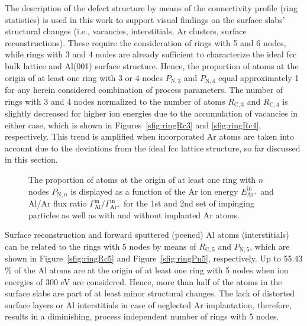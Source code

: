 \documentclass[12pt,a4paper,preprint,superscriptaddress]{revtex4-1}
\begin{document}
The description of the defect structure by means of the connectivity profile (ring statistics) is used in this work to support visual findings on the surface slabs' structural changes (i.e., vacancies, interstitials, Ar clusters, surface reconstructions). These require the consideration of rings with 5 and 6 nodes, while rings with 3 and 4 nodes are already sufficient to characterize the ideal fcc bulk lattice and Al(001) surface structure. Hence, the proportion of atoms at the origin of at least one ring with 3 or 4 nodes $P_{\mathrm{N},3}$ and $P_{\mathrm{N},4}$ equal approximately 1 for any herein considered combination of process parameters. The number of rings with 3 and 4 nodes normalized to the number of atoms $R_{\mathrm{C},3}$ and $R_{\mathrm{C},4}$ is slightly decreased for higher ion energies due to the accumulation of vacancies in either case, which is shown in Figures~\ref{sfig:ringRc3} and \ref{sfig:ringRc4}, respectively. This trend is amplified when incorporated Ar atoms are taken into account due to the deviations from the ideal fcc lattice structure, so far discussed in this section. 

\begin{figure}[t]
\hfill
{}
\caption{The proportion of atoms at the origin of at least one ring with $n$ nodes $P_{\mathrm{N},n}$ is displayed as a function of the Ar ion energy $E_\mathrm{Ar^+}^\mathrm{in}$ and Al/Ar flux ratio $\Gamma_\mathrm{Al}^\mathrm{in}/\Gamma_\mathrm{Ar^+}^\mathrm{in}$ for the 1st and 2nd set of impinging particles as well as with and without implanted Ar atoms.}
\label{fig:ringPn}
\end{figure}

Surface reconstruction and forward sputtered (peened) Al atoms (interstitials) can be related to the rings with 5 nodes by means of $R_{\mathrm{C},5}$ and $P_{\mathrm{N},5}$, which are shown in Figure~\ref{sfig:ringRc5} and Figure~\ref{sfig:ringPn5}, respectively. Up to 55.43 \% of the Al atoms are at the origin of at least one ring with 5 nodes when ion energies of 300 eV are considered. Hence, more than half of the atoms in the surface slabs are part of at least minor structural changes. The lack of distorted surface layers or Al interstitials in case of neglected Ar implantation, therefore, results in a diminishing, process independent number of rings with 5 nodes.
\end{document}
